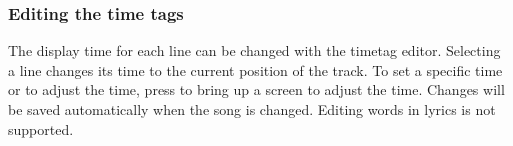 \subsubsection{Editing the time tags}

The display time for each line can be changed with the timetag editor.
Selecting a line changes its time to the current position of the track.
To set a specific time or to adjust the time, press \ActionStdContext{} to
bring up a screen to adjust the time.
Changes will be saved automatically when the song is changed.
Editing words in lyrics is not supported.
